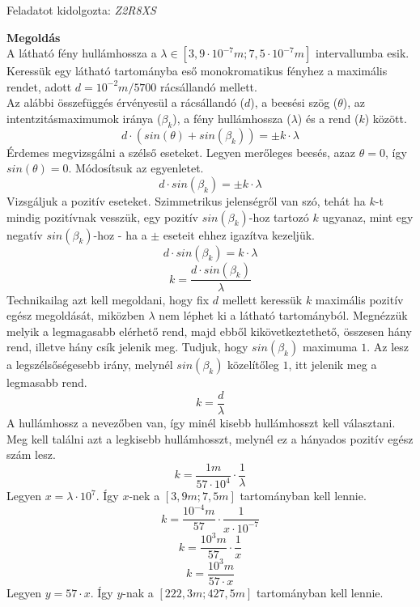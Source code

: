 \documentclass[11pt,a4paper,openany,leqno]{article}
\begin{document}
\begin{flushright} {Feladatot kidolgozta: {\it Z2R8XS}} \end{flushright}
\vspace{0.5cm}
\textbf{Megoldás}\\
\indent
A látható fény hullámhossza a $\lambda \in[3,9\cdot 10^{-7}m;7,5\cdot 10^{-7}m]$ intervallumba esik. Keressük egy látható tartományba eső monokromatikus fényhez a maximális rendet, adott $d=10^{-2}m/5700$ rácsállandó mellett.\\ \indent
Az alábbi összefüggés érvényesül a rácsállandó ($d$), a beesési szög ($\theta$), az intentzitásmaximumok iránya ($\beta_k$), a fény hullámhossza ($\lambda$) és a rend ($k$) között.\\
$$ d\cdot (sin(\theta) + sin(\beta_k)) = \pm k\cdot \lambda $$\indent
Érdemes megvizsgálni a szélső eseteket. Legyen merőleges beesés, azaz $\theta = 0$, így $sin(\theta)=0$. Módosítsuk az egyenletet.\\ \indent
$$ d\cdot sin(\beta_k) = \pm k\cdot \lambda $$\indent
Vizsgáljuk a pozitív eseteket. Szimmetrikus jelenségről van szó, tehát ha $k$-t mindig pozitívnak vesszük, egy pozitív $sin(\beta_k)$-hoz tartozó $k$ ugyanaz, mint egy negatív $sin(\beta_k)$-hoz - ha a $\pm$ eseteit ehhez igazítva kezeljük.\\
$$ d\cdot sin(\beta_k) = k\cdot \lambda $$
$$ k = \frac{d\cdot sin(\beta_k)}{\lambda} $$\indent
Technikailag azt kell megoldani, hogy fix $d$ mellett keressük $k$ maximális pozitív egész megoldását, miközben $\lambda$ nem léphet ki a látható tartományból. Megnézzük melyik a legmagasabb elérhető rend, majd ebből kikövetkeztethető, összesen hány rend, illetve hány csík jelenik meg. Tudjuk, hogy $sin(\beta_k)$ maximuma $1$. Az lesz a legszélsőségesebb irány, melynél $sin(\beta_k)$ közelítőleg $1$, itt jelenik meg a legmasabb rend.\\
$$ k = \frac{d}{\lambda} $$\indent
A hullámhossz a nevezőben van, így minél kisebb hullámhosszt kell választani. Meg kell találni azt a legkisebb hullámhosszt, melynél ez a hányados pozitív egész szám lesz.\\
$$ k = \frac{1m}{57\cdot 10^{4}}\cdot\frac{1}{\lambda} $$\indent
Legyen $x = \lambda\cdot 10^{7} $. Így $x$-nek a $[3,9m;7,5m]$ tartományban kell lennie.\\
$$ k = \frac{10^{-4}m}{57}\cdot\frac{1}{x \cdot 10^{-7}} $$
$$ k = \frac{10^{3}m}{57}\cdot\frac{1}{x} $$
$$ k = \frac{10^{3}m}{57\cdot x} $$\indent
Legyen $y = 57\cdot x $. Így $y$-nak a $[222,3m;427,5m]$ tartományban kell lennie.\\
\end{document}
